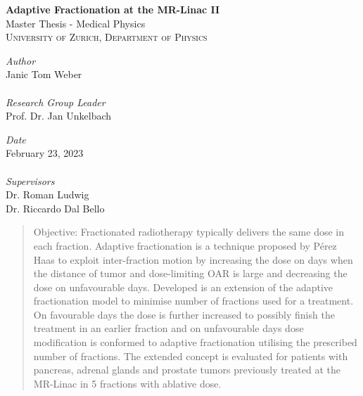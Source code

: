 \documentclass[\relativeRoot/ada.tex]{subfiles}
\begin{document}
\begin{titlepage}

\HRulebeta

\vspace{3cm}
  {\bfseries
	\Large\textbf{Adaptive Fractionation at the MR-Linac II}
	}\\[14pt]
	{Master Thesis - Medical Physics}\\[1pt]
	\textsc{University of Zurich, Department of Physics}
	\\[5pt]
	
\begin{addmargin}[1cm]{1cm}


\begin{minipage}[t]{0.6\textwidth}
\emph{Author}\\
Janic Tom Weber\\\\
\emph{Research Group Leader}\\
Prof. Dr. Jan Unkelbach \\
\end{minipage}
\begin{minipage}[t]{0.34\textwidth}
\emph{Date}\\
February 23, 2023\\\\
\emph{Supervisors}\\
Dr. Roman Ludwig \\
Dr. Riccardo Dal Bello\\[10pt]
\end{minipage}

\end{addmargin}

	

	
\begin{abstract}

    Objective: Fractionated radiotherapy typically delivers the same dose in each fraction. Adaptive fractionation is a technique proposed by Pérez Haas \cite{perezhaas_adaptive} to exploit inter-fraction motion by increasing the dose on days when the distance of tumor and dose-limiting OAR is large and decreasing the dose on unfavourable days. Developed is an extension of the adaptive fractionation model to minimise number of fractions used for a treatment. On favourable days the dose is further increased to possibly finish the treatment in an earlier fraction and on unfavourable days dose modification is conformed to adaptive fractionation utilising the prescribed number of fractions. The extended concept is evaluated for patients with pancreas, adrenal glands and prostate tumors previously treated at the MR-Linac in 5 fractions with ablative dose.


\end{abstract}
\end{titlepage}
\end{document}
